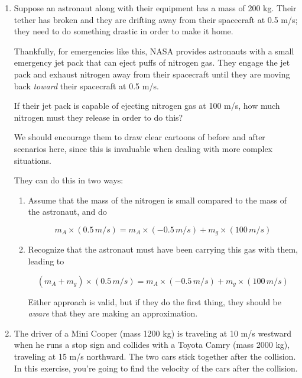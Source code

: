 \documentclass[12pt]{article}
\begin{document}
\newpage

\begin{enumerate}
	
	\item Suppose an astronaut along with their equipment has a mass of 200 kg. Their tether has broken and they are drifting away from their spacecraft at 0.5 m/s; they need to do something drastic in order to make it home.
	
	Thankfully, for emergencies like this, NASA provides astronauts with a small emergency jet pack that can eject puffs of nitrogen gas. They engage the jet pack and exhaust nitrogen away from their spacecraft until they are moving back {\it toward} their spacecraft at 0.5 m/s.
	
	If their jet pack is capable of ejecting nitrogen gas at 100 m/s, how much nitrogen must they release in order to do this?
	

{\color{red}

We should encourage them to draw clear cartoons of before and after scenarios here, since this is invaluable when dealing with more complex situations. 

They can do this in two ways:

\begin{enumerate}
	\item Assume that the mass of the nitrogen is small compared to the mass of the astronaut, and do
	
	$$
	m_A \times (0.5\, m/s) = m_A \times (-0.5\, m/s) + m_g \times (100\, m/s)
	$$
	
	\item Recognize that the astronaut must have been carrying this gas with them, leading to 

	$$
(m_A + m_g) \times (0.5\, m/s) = m_A \times (-0.5\, m/s) + m_g \times (100\, m/s)
$$

	Either approach is valid, but if they do the first thing, they should be {\it aware} that they are making an approximation.
\end{enumerate}


}


		\newpage
		
		\item{The driver of a Mini Cooper (mass 1200 kg) is traveling at 10 m/s westward when he runs a stop sign and collides with a Toyota Camry (mass 2000 kg), traveling at 15 m/s northward. The two cars stick together after the collision. In this exercise, you're going to find the velocity of the cars after the collision.}
		

\end{enumerate}
\end{document}
